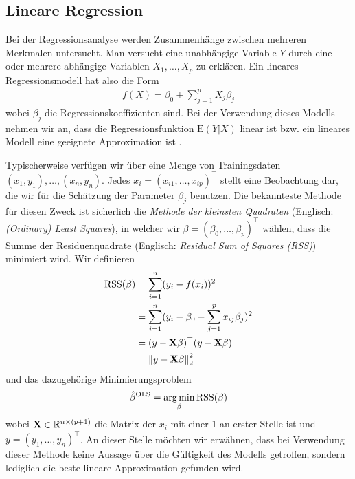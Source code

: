 

\subsection{Lineare Regression}

Bei der Regressionsanalyse werden Zusammenhänge zwischen
mehreren Merkmalen untersucht. Man versucht eine unabhängige Variable $Y$ durch eine oder mehrere abhängige Variablen $X_1, \ldots, X_p$ zu erklären. Ein lineares Regressionsmodell hat also die Form
\begin{align}
\label{linear_model}
f(X) = \beta_0 + \sum_{j=1}^p X_j\beta_j
\end{align}
wobei $\beta_j$ die Regressionskoeffizienten sind. Bei der Verwendung dieses Modells nehmen wir an, dass die Regressionsfunktion $\text{E}(Y|X)$ linear ist bzw. ein lineares Modell eine geeignete Approximation ist \cite{hastie_elements}.

Typischerweise verfügen wir über eine Menge von Trainingsdaten $(x_1, y_1), \ldots, (x_n, y_n)$. Jedes $x_i = (x_{i1}, \ldots, x_{ip})^{\top}$ stellt eine Beobachtung dar, die wir für die Schätzung der Parameter $\beta_j$ benutzen. Die bekannteste Methode für diesen Zweck ist sicherlich die \textit{Methode der kleinsten Quadraten} (Englisch: \textit{(Ordinary) Least Squares}), in welcher wir $\beta = (\beta_0, \ldots, \beta_p)^{\top}$ wählen, dass die Summe der Residuenquadrate (Englisch: \textit{Residual Sum of Squares (RSS)}) minimiert wird. Wir definieren
\begin{align}
\label{RSS}
\text{RSS}(\beta) & = \sum_{i=1}^{n}(y_i - f(x_i))^2\\
& = \sum_{i=1}^{n}(y_i - \beta_0 - \sum_{j=1}^p x_{ij}\beta_j)^2\nonumber\\
& = (y - \mathbf{X} \beta)^{\top}(y-\mathbf{X} \beta)\nonumber\\
& = \left\lVert y - \mathbf{X} \beta \right\rVert_{2}^{2}\nonumber
\end{align}
und das dazugehörige Minimierungsproblem
\begin{align}
\label{least_squares}
\hat{\beta}^{\text{OLS}} = \operatorname*{arg\,min}_{\beta} \text{RSS}(\beta)
\end{align}
wobei $\mathbf{X} \in \mathbb{R}^{n \times (p+1)}$ die Matrix der $x_i$ mit einer 1 an erster Stelle ist und $y = (y_1, \ldots, y_n)^{\top}$. An dieser Stelle möchten wir erwähnen, dass bei Verwendung dieser Methode keine Aussage über die Gültigkeit des Modells getroffen, sondern lediglich die beste lineare Approximation gefunden wird.

